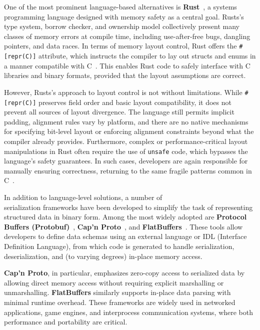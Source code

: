 \documentclass[12pt]{article}
\begin{document}
One of the most prominent language-based alternatives is 
\textbf{Rust}~\autocite{Rust_lang}, a systems programming language designed with memory
safety as a central goal. Rusts's type system, borrow checker, and
ownership model collectively present many classes of memory errors at
compile time, including use-after-free bugs, dangling pointers,
and data races. In terms of memory layout control, Rust offers the
\texttt{\#[repr(C)]} attribute, which instructs the compiler to lay out
structs and enums in a manner compatible with C~\autocite{rust_repr}. This enables Rust code
to safely interface with C libraries and binary formats, provided that
the layout assumptions are correct.

However, Rusts's approach to layout control is not without limitations.
While \texttt{\#[repr(C)]} preserves field order and basic layout
compatibility, it does not prevent all sources of layout divergence.
The language still permits implicit padding, alignment rules
vary by platform, and there are no native mechanisms for specifying
bit-level layout or enforcing alignment constraints beyond what the
compiler already provides. Furthermore, complex or performance-critical
layout manipulations in Rust often require the use of \texttt{unsafe}
code, which bypasses the language's safety guarantees. In such cases,
developers are again responsible for manually ensuring correctness,
returning to the same fragile patterns common in C~\autocite{unsafe_rust}.

In addition to language-level solutions, a number of\\ serialization frameworks
have been developed to simplify the task of representing structured data
in binary form. Among the most widely adopted are \textbf{Protocol Buffers
(Protobuf)}~\autocite{protobuf}, \textbf{Cap'n Proto}~\autocite{capn_proto_serialization},
 and \textbf{FlatBuffers}~\autocite{flat_buffers}. These tools
allow developers to define data schemas using an external language or
IDL (Interface Definition Language), from which code is generated to handle
serialization, deserialization, and (to varying degrees) in-place memory access.

\textbf{Cap'n Proto}, in particular, emphasizes zero-copy access to serialized
data by allowing direct memory access without requiring explicit marshalling or
unmarshalling.
\textbf{FlatBuffers} similarly supports in-place data parsing with minimal
runtime overhead. These frameworks are widely used in networked applications,
game engines, and interprocess communication systems, where both performance and
portability are critical.
\end{document}
